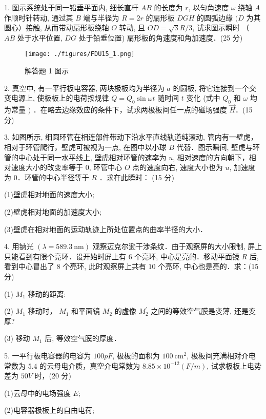 
1. 图示系统处于同一铅垂平面内, 细长直杆 $A B$ 的长度为 $r$, 以匀角速度 $\omega$ 绕轴 $A$ 作顺时针转动, 通过其 $B$ 端与半径为 $R=2 r$ 的扇形板 $D G H$ 的圆弧边缘 $(D$ 为其圆心）接触, 从而带动扇形板绕轴 $O$ 转动, 且 $O D=\sqrt{3} R / 3$, 试求图示瞬时 （ $A B$ 处于水平位置, $D G$ 处于铅垂位置) 扇形板的角速度和角加速度．(25 分)

\begin{figure}[ht]
\centering
\texttt{[image: ./figures/FDU15\_1.png]}
\caption{解答题 1 图示} \label{FDU15_fig1}
\end{figure}

2. 真空中, 有一平行板电容器, 两块极板均为半径为 $a$ 的圆板, 将它连接到一个交变电源上, 使极板上的电荷按规律 $Q=Q_{0} \sin \omega t$ 随时间 $t$ 变化 (式中 $Q_{0}$ 和 $\omega$ 均为常量 $)$ ．在略去边缘效应的条件下，试求两极板间任一点的磁场强度 $\vec{H}$．(15 分)

3. 如图所示, 细圆环管在相连部件带动下沿水平直线轨道纯滚动, 管内有一壁虎，相对于环管爬行，壁虎可被视为一点, 在图中以小球 $B$ 代替．图示瞬间, 壁虎与环管的中心处于同一水平线上, 壁虎相对环管的速率为 $u$, 相对速度的方向朝下，相对速度大小的改变率等于 $0$, 环管中心 $O$ 点的速度向右, 速度大小也为 $u$, 加速度为 $0$．环管的中心半径等于 $R$ ．求在此瞬时：
(15 分)

(1)壁虎相对地面的速度大小;

(2)壁虎相对地面的加速度大小;

(3)壁虎在相对地面的运动轨迹上所处位置点的曲率半径的大小．

4. 用钠光 $(\lambda=589.3 \mathrm{~nm})$ 观察迈克尔逊干涉条纹．由于观察屏的大小限制, 屏上只能看到有限个亮环．设开始时屏上有 $6$ 个亮环, 中心是亮的．移动平面镜 $R$ 后, 看到中心冒出了 $8$ 个亮环, 此时观察屏上共有 $10$ 个亮环, 中心也是亮的．求：(15 分)

(1) $M_{1}$ 移动的距离:

(2) $M_{1}$ 移动时， $M_{1}$ 和平面镜 $M_{2}$ 的虚像 $M_{2}^{\prime}$ 之间的等效空气膜是变薄, 还是变厚?

(3) 移动 $M_{1}$ 后, 等效空气膜的厚度．

5. 一平行板电容器的电容为 $100 p F$, 极板的面积为 $100 \mathrm{~cm}^{2}$, 极板间充满相对介电常数为 $5.4$ 的云母电介质，真空介电常数为 $8.85 \times 10^{-12}(F / m)$, 试求极板上电势差为 $50 V$ 时，(20 分)

(1)云母中的电场强度 $E$;

(2)电容器极板上的自由电荷;

